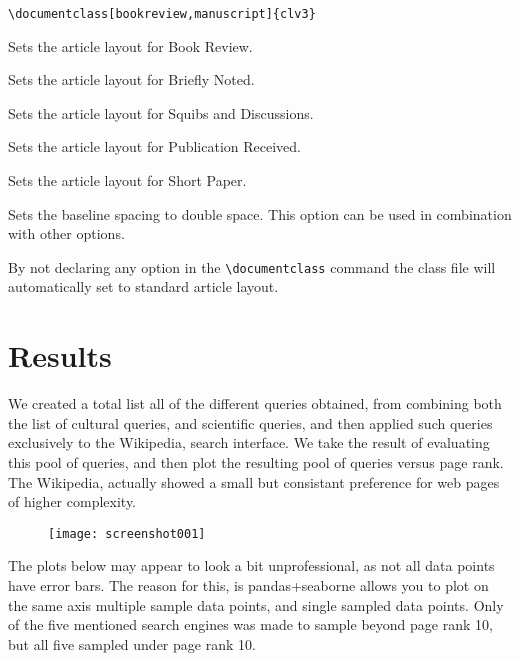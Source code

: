 \documentclass{clv3}
\begin{document}
\verb|\documentclass[bookreview,manuscript]{clv3}|


\begin{deflist}
\item[bookreview] Sets the article layout for Book Review.
\item[brief] Sets the article layout for Briefly Noted.
\item[discussion] Sets the article layout for Squibs and Discussions.
\item[pubrec] Sets the article layout for Publication Received.
\item[shortpaper] Sets the article layout for Short Paper.
\item[manuscript] Sets the baseline spacing to double space. This
option can be used in combination with other options.
\end{deflist}

By not declaring any option in the \verb|\documentclass| command the class file
will automatically set to standard article layout.

\section{Results}

We created a total list all of the different queries obtained, from combining both the list of cultural queries, and scientific queries, and then applied such queries exclusively to the Wikipedia, search interface. We take the result of evaluating this pool of queries, and then plot the resulting pool of queries versus page rank. The Wikipedia, actually showed a small but consistant preference for web pages of higher complexity.

\begin{figure}
	\centering
	\texttt{[image: screenshot001]}
	\caption{}
	\label{fig:figure1}
\end{figure}



The plots below may appear to look a bit unprofessional, as not all data points have error bars. The reason for this, is pandas+seaborne allows you to plot on the same axis multiple sample data points, and single sampled data points. Only of the five mentioned search engines was made to sample beyond page rank 10, but all five sampled under page rank 10.
\end{document}

